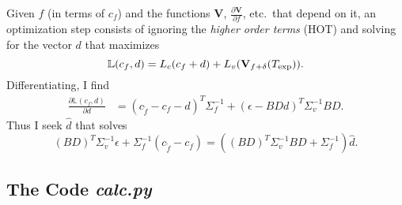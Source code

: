 \documentclass[11pt]{article}
\newcommand{\fnom}{\tilde f}
\newcommand{\partiald}[2]{\frac{\partial #1}{\partial #2}}
\newcommand\Vt{\mathbf{V}}
\newcommand\texp{T_{\rm{exp}}}
\newcommand\cf{c_f}
\newcommand\DVDf{\partiald{\Vt}{f}}
\newcommand\Lbb{\mathbb{L}}
\begin{document}
Given $f$ (in terms of $\cf$) and the functions $\Vt$, $\DVDf$, etc.\
that depend on it, an optimization step consists of ignoring the
\emph{higher order terms} (HOT) and solving for the vector $d$ that
maximizes
\begin{equation}
  \label{eq:L}
  \Lbb(\cf,d) = L_c(\cf + d) + L_v(\Vt_{f+\delta}(\texp)).
\end{equation}
Differentiating, I find
\begin{align*}
  \partiald{\Lbb(\cf,d)}{d} &= (c_{\fnom} - \cf - d)^T
  \Sigma^{-1}_f + (\epsilon - BDd)^T \Sigma_v^{-1}BD.
\end{align*}
Thus I seek $\hat d$ that solves
\begin{equation}
  \label{eq:dmap}
  (BD)^T\Sigma_v^{-1}\epsilon + \Sigma_f^{-1} (c_{\tilde f} - \cf) = 
  \left((BD)^T\Sigma_v^{-1}BD + \Sigma_f^{-1} \right) \hat d.
\end{equation}

\subsection{The Code \emph{calc.py}}
\label{sec:code}
\end{document}
